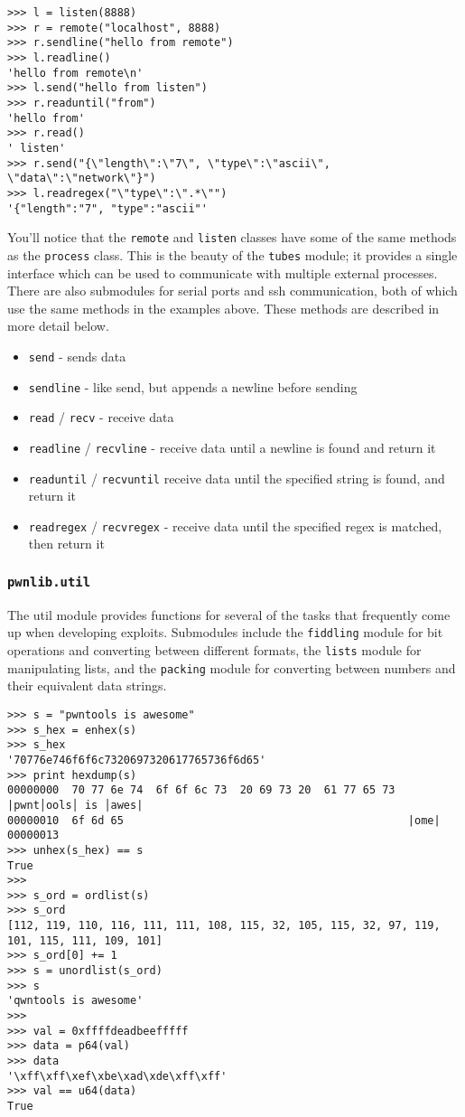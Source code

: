 \begin{lstlisting}
>>> l = listen(8888)
>>> r = remote("localhost", 8888)
>>> r.sendline("hello from remote")
>>> l.readline()
'hello from remote\n'
>>> l.send("hello from listen")
>>> r.readuntil("from")
'hello from'
>>> r.read()
' listen'
>>> r.send("{\"length\":\"7\", \"type\":\"ascii\", \"data\":\"network\"}")
>>> l.readregex("\"type\":\".*\"")
'{"length":"7", "type":"ascii"'
\end{lstlisting}

You'll notice that the \texttt{remote} and \texttt{listen} classes have some of
the same methods as the \texttt{process} class. This is the beauty of the
\texttt{tubes} module; it provides a single interface which can be used to
communicate with multiple external processes. There are also submodules for
serial ports and ssh communication, both of which use the same methods in the
examples above. These methods are described in more detail below.

\begin{itemize}
    \item \texttt{send} - sends data
    \item \texttt{sendline} - like send, but appends a newline before sending
    \item \texttt{read} / \texttt{recv} - receive data
    \item \texttt{readline} / \texttt{recvline} - receive data until a newline is found and return
        it
    \item \texttt{readuntil} / \texttt{recvuntil} receive data until the specified string is found,
        and return it
    \item \texttt{readregex} / \texttt{recvregex} - receive data until the specified regex is
        matched, then return it
\end{itemize}

\subsubsection{\texttt{pwnlib.util}}
The util module provides functions for several of the tasks that
frequently come up when developing exploits. Submodules include the
\texttt{fiddling} module for bit operations and converting between different
formats, the \texttt{lists} module for manipulating lists, and the
\texttt{packing} module for converting between numbers and their equivalent
data strings.

\begin{lstlisting}
>>> s = "pwntools is awesome"
>>> s_hex = enhex(s)
>>> s_hex
'70776e746f6f6c7320697320617765736f6d65'
>>> print hexdump(s)
00000000  70 77 6e 74  6f 6f 6c 73  20 69 73 20  61 77 65 73  |pwnt│ools│ is │awes|
00000010  6f 6d 65                                            |ome|
00000013
>>> unhex(s_hex) == s
True
>>>
>>> s_ord = ordlist(s)
>>> s_ord
[112, 119, 110, 116, 111, 111, 108, 115, 32, 105, 115, 32, 97, 119, 101, 115, 111, 109, 101]
>>> s_ord[0] += 1
>>> s = unordlist(s_ord)
>>> s
'qwntools is awesome'
>>>
>>> val = 0xffffdeadbeefffff
>>> data = p64(val)
>>> data
'\xff\xff\xef\xbe\xad\xde\xff\xff'
>>> val == u64(data)
True
\end{lstlisting}

